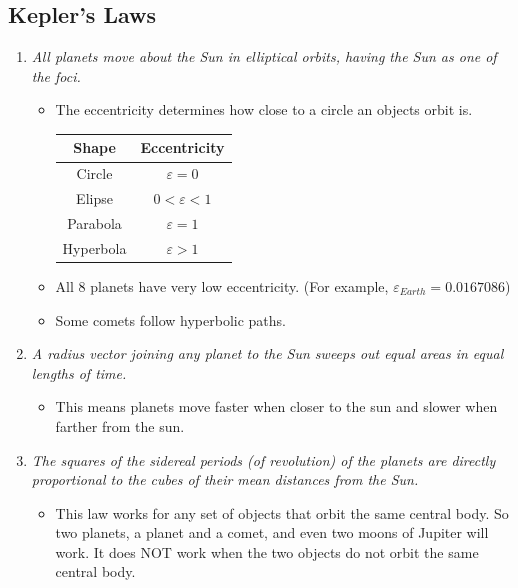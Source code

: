 \documentclass[letterpaper, 12pt]{article}
\begin{document}
\subsection*{Kepler's Laws}
	\begin{enumerate}
		\item \textit{All planets move about the Sun in elliptical orbits, having the Sun as one of the foci.}
			\begin{itemize}
				\item The eccentricity determines how close to a circle an objects orbit is.  
				\begin{center}
					\begin{tabular}{|c|c|} \hline
						 \textbf{Shape} & \textbf{Eccentricity} \\ \hline
						  Circle & $\varepsilon = 0 $ \\ \hline
						  Elipse & $ 0 < \varepsilon  < 1 $ \\ \hline
						  Parabola & $\varepsilon = 1 $ \\ \hline
						  Hyperbola & $ \varepsilon  > 1 $ \\ \hline
						  
						 
					\end{tabular}
				\end{center}
				\item All 8 planets have very low eccentricity.  (For example,  $ \varepsilon_{Earth} = 0.0167086$)
				\item Some comets follow hyperbolic paths. 
			\end{itemize}
		
		\item\textit{ A radius vector joining any planet to the Sun sweeps out equal areas in equal lengths of time.}
		\begin{itemize}
			\item This means planets move faster when closer to the sun and slower when farther from the sun. 
		\end{itemize}
		
		\item \textit{The squares of the sidereal periods (of revolution) of the planets are directly proportional to the cubes of their mean distances from the Sun. }
		\begin{itemize}
			\item This law works for any set of objects that orbit the same central body.  So two planets, a planet and a comet, and even two moons of Jupiter will work.  It does NOT work when the two objects do not orbit the same central body.  
		\end{itemize}
		
	\end{enumerate}
\end{document}
